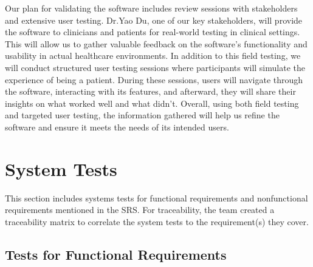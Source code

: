 \documentclass[12pt, titlepage]{article}
\begin{document}



Our plan for validating the software includes review sessions with 
stakeholders and extensive user testing. Dr.Yao Du, one of our key 
stakeholders, will provide the software to clinicians and patients for 
real-world testing in clinical settings. This will allow us to gather 
valuable feedback on the software’s functionality and usability in 
actual healthcare environments. In addition to this field testing, we 
will conduct structured user testing sessions where participants will 
simulate the experience of being a patient. During these sessions, 
users will navigate through the software, interacting with its features,
and afterward, they will share their insights on what worked well and 
what didn’t. Overall, using both field testing and targeted user testing, the information
gathered will help us refine the 
software and ensure it meets the needs of its intended users. 

\newpage
\section{System Tests}
\hspace{2em}This section includes systems tests for functional requirements and nonfunctional
requirements mentioned in the SRS. For traceability, the team created a traceability
matrix to correlate the system tests to the requirement(s) they cover.

\subsection{Tests for Functional Requirements}


\end{document}
